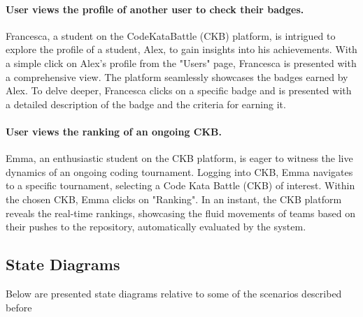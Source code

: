 \paragraph*{User views the profile of another user to check their badges.}
Francesca, a student on the CodeKataBattle (CKB) platform, is intrigued to explore the profile of a student, Alex, to gain insights into his achievements. 
With a simple click on Alex's profile from the "Users" page, Francesca is presented with a comprehensive view. 
The platform seamlessly showcases the badges earned by Alex. 
To delve deeper, Francesca clicks on a specific badge and is presented with a detailed description of the badge and the criteria for earning it.

\paragraph*{User views the ranking of an ongoing CKB.}
Emma, an enthusiastic student on the CKB platform, is eager to witness the live dynamics of an ongoing coding tournament.
Logging into CKB, Emma navigates to a specific tournament, selecting a Code Kata Battle (CKB) of interest.
Within the chosen CKB, Emma clicks on "Ranking". In an instant, the CKB platform reveals the real-time rankings, showcasing the fluid movements of teams based on their pushes to the repository, automatically evaluated by the system.


\subsection{State Diagrams}
\label{subsec:state_diagrams}%

Below are presented state diagrams relative to some of the scenarios described before

